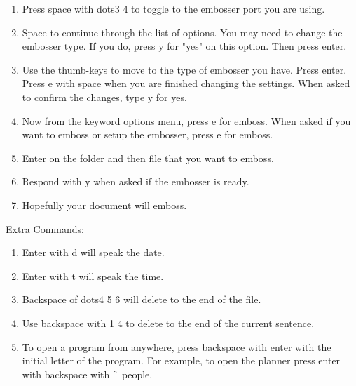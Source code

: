 \documentclass[10pt,letterpaper,twoside]{report}
\begin{document}
{{{{\begin{enumerate}
\begin{enumerate}
		      \item File
	      \end{enumerate}
	      
	\item Press space with dots3 4 to toggle to the embosser port you are using.
	      
	\item Space to continue through the list of options.  You may need to change the embosser type. If you do, press y for "yes" on this option.  Then press enter.
	      
	\item Use the thumb-keys to move to the type of embosser you have.  Press enter. Press e with space when you are finished changing the settings.  When asked to confirm the changes, type y for yes.
	      
	\item Now from the keyword options menu, press e for emboss.  When asked if you want to emboss or setup the embosser, press e for emboss.
	      
	\item Enter on the folder and then file that you want to emboss.
	      
	\item Respond with y when asked if the embosser is ready.
	      
	\item Hopefully your document will emboss.
\end{enumerate}



Extra Commands:



\begin{enumerate}
	\item Enter with d will speak the date.
	      
	\item Enter with t will speak the time.
	      
	\item Backspace of dots4 5 6 will delete to the end of the file.
	      
	\item Use backspace with 1 4 to delete to the end of the current sentence.
	      
	\item To open a program from anywhere, press backspace with enter with the initial letter of the program.  For example, to open the planner press enter with backspace with $ \string^ $ people.
	      

\end{enumerate}}}}}
\end{document}
